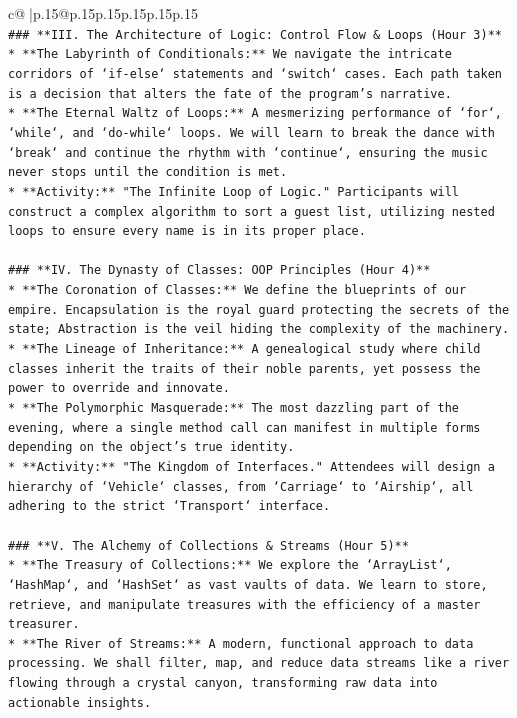 \documentclass{article}
\begin{document}
{\begin{supertabular}{c@{$\;$}|p{.15\linewidth}@{}p{.15\linewidth}p{.15\linewidth}p{.15\linewidth}p{.15\linewidth}p{.15\linewidth}}
{{{\\ 
\texttt{\#\#\# **III. The Architecture of Logic: Control Flow \& Loops (Hour 3)**} \\
\texttt{*   **The Labyrinth of Conditionals:** We navigate the intricate corridors of `if{-}else` statements and `switch` cases. Each path taken is a decision that alters the fate of the program's narrative.} \\
\texttt{*   **The Eternal Waltz of Loops:** A mesmerizing performance of `for`, `while`, and `do{-}while` loops. We will learn to break the dance with `break` and continue the rhythm with `continue`, ensuring the music never stops until the condition is met.} \\
\texttt{*   **Activity:** "The Infinite Loop of Logic." Participants will construct a complex algorithm to sort a guest list, utilizing nested loops to ensure every name is in its proper place.} \\
\\ 
\texttt{\#\#\# **IV. The Dynasty of Classes: OOP Principles (Hour 4)**} \\
\texttt{*   **The Coronation of Classes:** We define the blueprints of our empire. Encapsulation is the royal guard protecting the secrets of the state; Abstraction is the veil hiding the complexity of the machinery.} \\
\texttt{*   **The Lineage of Inheritance:** A genealogical study where child classes inherit the traits of their noble parents, yet possess the power to override and innovate.} \\
\texttt{*   **The Polymorphic Masquerade:** The most dazzling part of the evening, where a single method call can manifest in multiple forms depending on the object's true identity.} \\
\texttt{*   **Activity:** "The Kingdom of Interfaces." Attendees will design a hierarchy of `Vehicle` classes, from `Carriage` to `Airship`, all adhering to the strict `Transport` interface.} \\
\\ 
\texttt{\#\#\# **V. The Alchemy of Collections \& Streams (Hour 5)**} \\
\texttt{*   **The Treasury of Collections:** We explore the `ArrayList`, `HashMap`, and `HashSet` as vast vaults of data. We learn to store, retrieve, and manipulate treasures with the efficiency of a master treasurer.} \\
\texttt{*   **The River of Streams:** A modern, functional approach to data processing. We shall filter, map, and reduce data streams like a river flowing through a crystal canyon, transforming raw data into actionable insights.} \\
}}}
\end{supertabular}}
\end{document}
